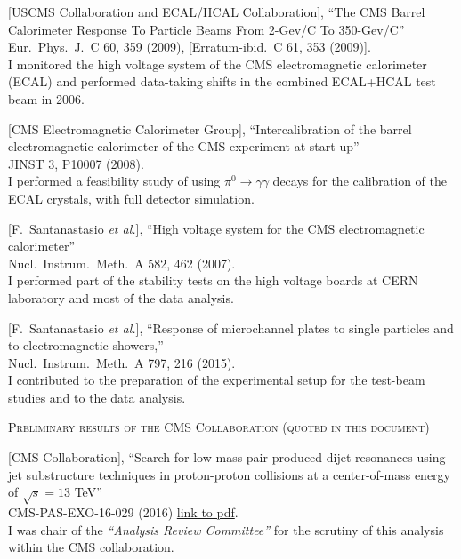 \documentclass[10pt, a4paper]{article}
\begin{document}
\begin{thebibliography}{599}
[USCMS Collaboration and ECAL/HCAL Collaboration],
``The CMS Barrel Calorimeter Response To Particle Beams From 2-Gev/C To 350-Gev/C''\\
Eur.\ Phys.\ J.\  C 60, 359 (2009), [Erratum-ibid.\  C 61, 353 (2009)].\\
I monitored the high voltage system of the CMS electromagnetic
calorimeter (ECAL) and performed data-taking shifts in the combined ECAL+HCAL test beam in 2006.

[CMS Electromagnetic Calorimeter Group],
``Intercalibration of the barrel electromagnetic calorimeter of the CMS  experiment at start-up''\\
JINST 3, P10007 (2008).
\\ I performed a feasibility study of using $\pi^0 \rightarrow \gamma \gamma$ decays for the calibration of the ECAL crystals, with full detector simulation.

 [F.~Santanastasio {\it et al.}],
``High voltage system for the CMS electromagnetic calorimeter''\\
 Nucl.\ Instrum.\ Meth.\  A 582, 462 (2007).
 \\ I performed part of the stability tests on the high voltage boards at CERN laboratory and most of the data analysis. 

[F.~Santanastasio {\it et al.}],
  ``Response of microchannel plates to single particles and to electromagnetic showers,''\\
Nucl.\ Instrum.\ Meth.\ A 797, 216 (2015).\\
I contributed to the preparation of the experimental setup for the
test-beam studies and to the data analysis.


\vspace{0.1cm} \begin{center} \textsc{Preliminary results of the CMS
    Collaboration (quoted in this document)} \end{center} \vspace{0.05cm}

  [CMS Collaboration], 
  ``Search for low-mass
  pair-produced dijet resonances using jet substructure techniques in
  proton-proton collisions at a center-of-mass energy of $\sqrt{s}=13$
  TeV''\\
  CMS-PAS-EXO-16-029 (2016)
  \href{http://cds.cern.ch/record/2231062/files/EXO-16-029-pas.pdf}{link
    to pdf}.
  \\ I was chair of the {\it``Analysis Review Committee''} for the scrutiny of this analysis within the CMS collaboration. 


\end{thebibliography}
\end{document}
